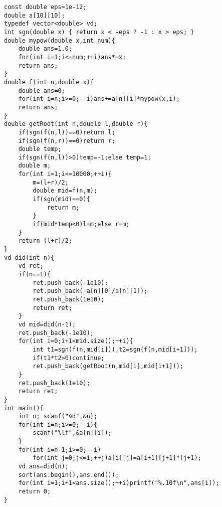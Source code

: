 \begin{lstlisting}
const double eps=1e-12;
double a[10][10];
typedef vector<double> vd;
int sgn(double x) { return x < -eps ? -1 : x > eps; }
double mypow(double x,int num){
	double ans=1.0;
	for(int i=1;i<=num;++i)ans*=x;
	return ans;
}
double f(int n,double x){
	double ans=0;
	for(int i=n;i>=0;--i)ans+=a[n][i]*mypow(x,i);
	return ans;
}
double getRoot(int n,double l,double r){
	if(sgn(f(n,l))==0)return l;
	if(sgn(f(n,r))==0)return r;
	double temp;
	if(sgn(f(n,l))>0)temp=-1;else temp=1;
	double m;
	for(int i=1;i<=10000;++i){
		m=(l+r)/2;
		double mid=f(n,m);
		if(sgn(mid)==0){
			return m;
		}
		if(mid*temp<0)l=m;else r=m;
	}
	return (l+r)/2;
}
vd did(int n){
	vd ret;
	if(n==1){
		ret.push_back(-1e10);
		ret.push_back(-a[n][0]/a[n][1]);
		ret.push_back(1e10);
		return ret;
	}
	vd mid=did(n-1);
	ret.push_back(-1e10);
	for(int i=0;i+1<mid.size();++i){
		int t1=sgn(f(n,mid[i])),t2=sgn(f(n,mid[i+1]));
		if(t1*t2>0)continue;
		ret.push_back(getRoot(n,mid[i],mid[i+1]));
	}
	ret.push_back(1e10);
	return ret;
}
int main(){
	int n; scanf("%d",&n);
	for(int i=n;i>=0;--i){
		scanf("%lf",&a[n][i]);
	}
	for(int i=n-1;i>=0;--i)
		for(int j=0;j<=i;++j)a[i][j]=a[i+1][j+1]*(j+1);
	vd ans=did(n);
	sort(ans.begin(),ans.end());
	for(int i=1;i+1<ans.size();++i)printf("%.10f\n",ans[i]);
	return 0;
}
\end{lstlisting}
